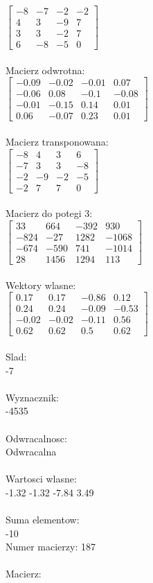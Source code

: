 \documentclass[a4paper,12pt]{article}
\begin{document}
$\begin{bmatrix} -8&-7&-2&-2\\4&3&-9&7\\3&3&-2&7\\6&-8&-5&0 \end{bmatrix}$
\\
\\
Macierz odwrotna:\\

$\begin{bmatrix} -0.09&-0.02&-0.01&0.07\\-0.06&0.08&-0.1&-0.08\\-0.01&-0.15&0.14&0.01\\0.06&-0.07&0.23&0.01 \end{bmatrix}$
\\
\\
Macierz transponowana:\\

$\begin{bmatrix} -8&4&3&6\\-7&3&3&-8\\-2&-9&-2&-5\\-2&7&7&0 \end{bmatrix}$
\\
\\
Macierz do potegi 3:\\

$\begin{bmatrix} 33&664&-392&930\\-824&-27&1282&-1068\\-674&-590&741&-1014\\28&1456&1294&113 \end{bmatrix}$
\\
\\
Wektory wlasne:\\

$\begin{bmatrix} 0.17&0.17&-0.86&0.12\\0.24&0.24&-0.09&-0.53\\-0.02&-0.02&-0.11&0.56\\0.62&0.62&0.5&0.62 \end{bmatrix}$
\\
\\
Slad:\\
-7
\\
\\
Wyznacznik:\\
-4535
\\
\\
Odwracalnosc:\\
Odwracalna
\\
\\
Wartosci wlasne:\\
-1.32 -1.32 -7.84 3.49
\\
\\
Suma elementow:\\
-10
\\
\newpage
Numer macierzy:
187
\\
\\
Macierz:\\
\end{document}
